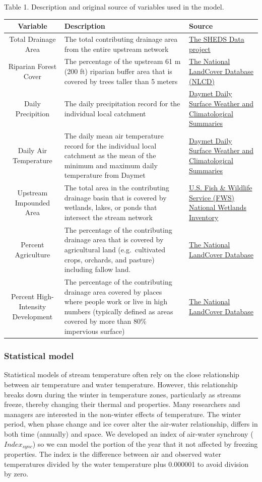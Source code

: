 Table 1. Description and original source of variables used in the model.

\begin{longtable}[c]{@{}cll@{}}
\toprule
Variable & Description & Source\tabularnewline
\midrule
\endhead
Total Drainage Area & The total contributing drainage area from the
entire upstream network &
\href{http://conte-ecology.github.io/shedsData/}{The SHEDS Data
project}\tabularnewline
Riparian Forest Cover & The percentage of the upstream 61 m (200 ft)
riparian buffer area that is covered by trees taller than 5 meters &
\href{http://www.mrlc.gov/nlcd06_data.php}{The National LandCover
Database (NLCD)}\tabularnewline
Daily Precipition & The daily precipitation record for the individual
local catchment & \href{https://daymet.ornl.gov/}{Daymet Daily Surface
Weather and Climatological Summaries}\tabularnewline
Daily Air Temperature & The daily mean air temperature record for the
individual local catchment as the mean of the minimum and maximum daily
temperature from Daymet & \href{https://daymet.ornl.gov/}{Daymet Daily
Surface Weather and Climatological Summaries}\tabularnewline
Upstream Impounded Area & The total area in the contributing drainage
basin that is covered by wetlands, lakes, or ponds that intersect the
stream network &
\href{http://www.fws.gov/wetlands/Data/Data-Download.html}{U.S. Fish \&
Wildlife Service (FWS) National Wetlands Inventory}\tabularnewline
Percent Agriculture & The percentage of the contributing drainage area
that is covered by agricultural land (e.g.~cultivated crops, orchards,
and pasture) including fallow land. &
\href{http://www.mrlc.gov/nlcd06_data.php}{The National LandCover
Database}\tabularnewline
Percent High-Intensity Development & The percentage of the contributing
drainage area covered by places where people work or live in high
numbers (typically defined as areas covered by more than 80\% impervious
surface) & \href{http://www.mrlc.gov/nlcd06_data.php}{The National
LandCover Database}\tabularnewline
\bottomrule
\end{longtable}

\subsubsection{Statistical model}\label{statistical-model}

Statistical models of stream temperature often rely on the close
relationship between air temperature and water temperature. However,
this relationship breaks down during the winter in temperature zones,
particularly as streams freeze, thereby changing their thermal and
properties. Many researchers and managers are interested in the
non-winter effects of temperature. The winter period, when phase change
and ice cover alter the air-water relationship, differs in both time
(annually) and space. We developed an index of air-water synchrony
(\(Index_{sync}\)) so we can model the portion of the year that it not
affected by freezing properties. The index is the difference between air
and observed water temperatures divided by the water temperature plus
0.000001 to avoid division by zero.

